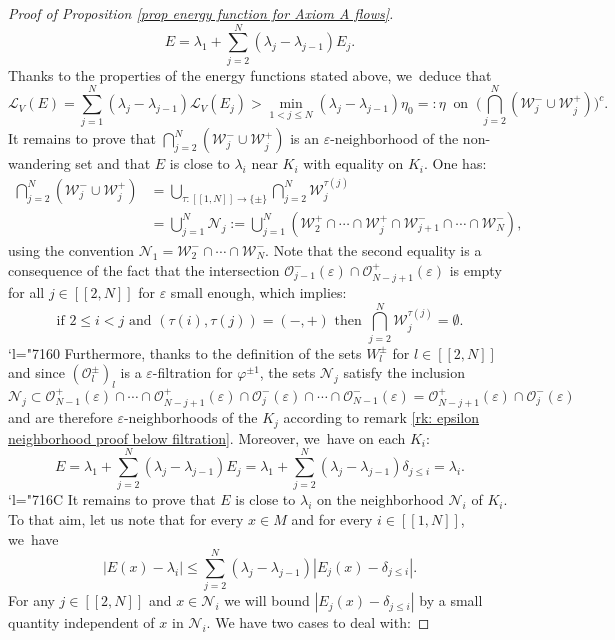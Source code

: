 \documentclass[11pt]{article}
\newcommand{\Changel}{\mathcode`l="7160}
\newcommand{\Changelback}{\mathcode`l="716C}
\newcommand{\lcr}{[\![}
\newcommand{\rcr}{]\!]}
\theoremstyle{definition}
\theoremstyle{plain}
\newcommand{\Lie}{\mathcal{L}}
\newcommand{\Ncal}{\mathcal{N}}
\newcommand{\Ocal}{\mathcal{O}}
\newcommand{\Wcal}{\mathcal{W}}
\begin{document}
\begin{proof}[Proof of Proposition \ref{prop energy function for Axiom A flows}]
\[
E = \lambda_1 + \sum_{j = 2}^N (\lambda_{j} - \lambda_{j-1}) E_{j}.
\]
Thanks to the properties of the energy functions stated above, we~deduce that
\[
\Lie_V (E) = \sum_{j = 1}^N (\lambda_j - \lambda_{j-1}) \Lie_V (E_j) > \min_{1 < j \leq N}(\lambda_j - \lambda_{j-1}) \eta_0 =: \eta \: \text{ on } \: \biggl(\bigcap_{j =2}^N (\Wcal_j^- \cup \Wcal_j^+) \biggr)^c.
\]
It remains to prove that $\bigcap_{j = 2}^N (\Wcal_j^- \cup \Wcal_j^+)$ is an $\varepsilon$-neighborhood of the non-wandering set and that $E$ is close to $\lambda_i$ near $K_i$ with equality on $K_i$. One has:
\begin{align*}
\bigcap_{j = 2}^N (\Wcal_j^- \cup \Wcal_j^+) &= \bigcup_{\tau: \lcr1,N\rcr \to \{\pm\}} \bigcap_{j = 2}^N \Wcal_j^{\tau (j)} \\
&= \bigcup_{j = 1}^N \Ncal_j:= \bigcup_{j = 1}^N \left(\Wcal_{2}^+ \cap \cdots \cap \Wcal_{j}^+ \cap \Wcal_{j+1}^- \cap \cdots \cap \Wcal_{N}^- \right),
\end{align*}
using the convention $\Ncal_1 = \Wcal_{2}^- \cap \cdots \cap \Wcal_{N}^-$.
Note that the second equality is a consequence of the fact that the intersection $\Ocal_{j-1}^- (\varepsilon) \cap \Ocal_{N-j+1}^+ (\varepsilon)$ is empty for all $j\in\lcr2,N\rcr$ for $\varepsilon $ small enough, which implies:
\[
\text{if } 2 \leq i < j \text{ and } (\tau (i), \tau (j)) = (-,+) \text{ then } \bigcap_{j = 2}^N \Wcal_j^{\tau (j)} = \emptyset.
\]
\Changel
\noindent
Furthermore, thanks to the definition of the sets $W_l^{\pm}$ for $l\in\lcr2,N\rcr$ and since $(\Ocal_l^{\pm})_l$ is a $\varepsilon$-filtration for $\varphi^{\pm 1}$, the sets $\Ncal_j$ satisfy the inclusion
\[
\Ncal_j \subset \Ocal_{N-1}^+ (\varepsilon) \cap \cdots \cap \Ocal_{N-j+1}^+ (\varepsilon) \cap \Ocal_{j}^- (\varepsilon) \cap \cdots \cap \Ocal_{N-1}^- (\varepsilon) = \Ocal_{N-j+1}^+ (\varepsilon) \cap \Ocal_{j}^- (\varepsilon)
\]
and are therefore $\varepsilon$-neighborhoods of the $K_j$ according to remark \ref{rk: epsilon neighborhood proof below filtration}.
Moreover, we~have on each $K_i$:
\[
E = \lambda_1 + \sum_{j = 2}^N (\lambda_j - \lambda_{j-1}) E_j = \lambda_1 + \sum_{j = 2}^N (\lambda_j - \lambda_{j-1}) \delta_{j \leq i} = \lambda_i.
\]
\Changelback
\noindent
It remains to prove that $E$ is close to $\lambda_i$ on the neighborhood $\Ncal_i$ of $K_i$. To that aim, let us note that for every $x \in M$ and for every $i\in\lcr1,N\rcr$, we~have
\[
|E(x) - \lambda_i | \leq \sum_{j = 2}^N (\lambda_j - \lambda_{j-1}) |E_j (x) - \delta_{j \leq i} |.
\]
For any $j\in\lcr2,N\rcr$ and $x \in \Ncal_i$ we will bound $|E_j (x) - \delta_{j \leq i}|$ by a small quantity independent of $x$ in $\Ncal_i$. We have two cases to deal with:

\end{proof}
\end{document}
